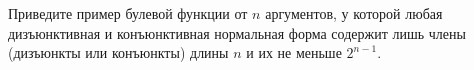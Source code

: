 Приведите пример булевой функции от $n$ аргументов, у которой любая дизъюнктивная и конъюнктивная нормальная форма содержит
лишь члены (дизъюнкты или конъюнкты) длины $n$ и их не меньше $2^{n - 1}$.
